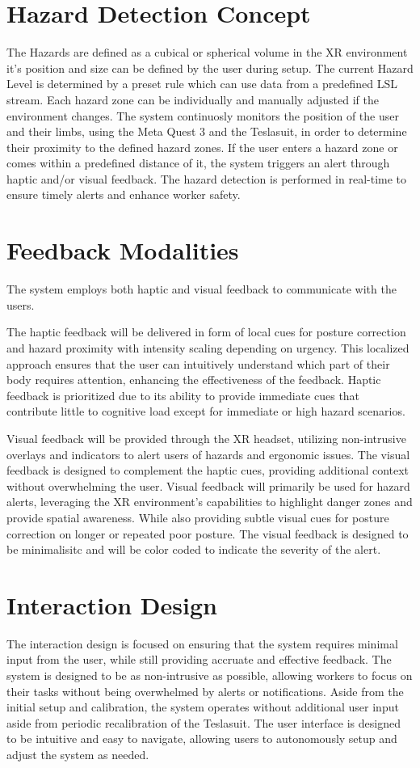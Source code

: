 \section{Hazard Detection Concept}
The Hazards are defined as a cubical or spherical volume in the XR environment it's position and size can be defined by the user during setup. The current Hazard Level is determined by a preset rule which can use data from a predefined LSL stream.
Each hazard zone can be individually and manually adjusted if the environment changes.
The system continuosly monitors the position of the user and their limbs, using the Meta Quest 3 and the Teslasuit, in order to determine their proximity to the defined hazard zones. If the user enters a hazard zone or comes within a predefined distance of it, the system triggers an alert through haptic and/or visual feedback. The hazard detection is performed in real-time to ensure timely alerts and enhance worker safety. 

\section{Feedback Modalities}
The system employs both haptic and visual feedback to communicate with the users. 

The haptic feedback will be delivered in form of local cues for posture correction and hazard proximity with intensity scaling depending on urgency. This localized approach ensures that the user can intuitively understand which part of their body requires attention, enhancing the effectiveness of the feedback. Haptic feedback is prioritized due to its ability to provide immediate cues that contribute little to cognitive load except for immediate or high hazard scenarios. 


Visual feedback will be provided through the XR headset, utilizing non-intrusive overlays and indicators to alert users of hazards and ergonomic issues. The visual feedback is designed to complement the haptic cues, providing additional context without overwhelming the user. Visual feedback will primarily be used for hazard alerts, leveraging the XR environment's capabilities to highlight danger zones and provide spatial awareness. While also providing subtle visual cues for posture correction on longer or repeated poor posture. The visual feedback is designed to be minimalisitc and will be color coded to indicate the severity of the alert.

\section{Interaction Design}
The interaction design is focused on ensuring that the system requires minimal input from the user, while still providing accruate and effective feedback. The system is designed to be as non-intrusive as possible, allowing workers to focus on their tasks without being overwhelmed by alerts or notifications. Aside from the initial setup and calibration, the system operates without additional user input aside from periodic recalibration of the Teslasuit. The user interface is designed to be intuitive and easy to navigate, allowing users to autonomously setup and adjust the system as needed.



